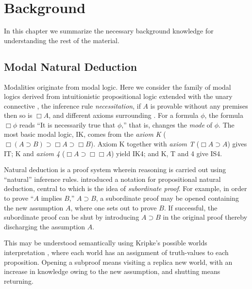 \documentclass[12pt,twoside,openright]{report}
\numberwithin{equation}{chapter}
\numberwithin{figure}{chapter}
\numberwithin{table}{chapter}
\theoremstyle{definition}\newtheorem{definition}{Definition}
\begin{document}
\chapter{Background}\label{sec:background}

In this chapter we summarize the necessary background knowledge
for understanding the rest of the material.

\section{Modal Natural Deduction}

Modalities originate from modal logic.
Here we consider the family of modal logics
derived from intuitionistic propositional logic
extended with the unary connective \Box{},
the inference rule \emph{necessitation},
if $A$ is provable without any premises then so is $\Box A$,
and different axioms surrounding \Box{} \cite{clouston18}.
For a formula $\phi$, the formula $\Box \phi$ reads
``It is necessarily true that $\phi$,''
that is, \Box{} changes the \emph{mode} of $\phi$.
The most basic modal logic, IK, comes from the \emph{axiom K}
($\Box (A \supset B) \supset \Box A \supset \Box B$).
Axiom K together with \emph{axiom T} ($\Box A \supset A$) gives IT;
K and \emph{axiom 4} ($\Box A \supset \Box\Box A$) yield IK4;
and K, T and 4 give IS4.

Natural deduction is a proof system
wherein reasoning is carried out using ``natural'' inference rules.
\textcite{fitch52} introduced a notation for propositional natural deduction,
central to which is the idea of \emph{subordinate proof}.
For example, in order to prove ``$A$ implies $B$,'' $A \supset B$,
a subordinate proof may be opened containing the new assumption $A$,
where one sets out to prove $B$.
If successful, the subordinate proof can be shut
by introducing $A \supset B$ in the original proof
thereby discharging the assumption $A$.

This may be understood semantically using Kripke's possible worlds interpretation
\cite{kripke63, huth04},
where each world has an assignment of truth-values to each proposition.
Opening a subproof means visiting a replica new world,
with an increase in knowledge owing to the new assumption,
and shutting means returning.
\end{document}
